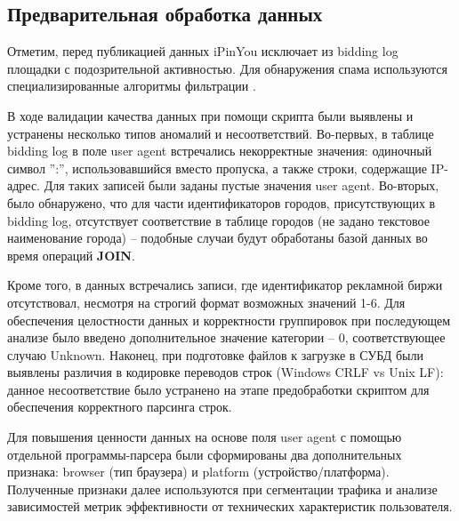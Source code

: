 \subsection{Предварительная обработка данных}
\label{subsec:data_preprocessing}

Отметим, перед публикацией данных iPinYou исключает из bidding log площадки с подозрительной активностью. Для обнаружения спама используются специализированные алгоритмы фильтрации \cite{ipinyou-contest-database}.

В ходе валидации качества данных при помощи скрипта были выявлены и устранены несколько типов аномалий и несоответствий. Во-первых, в таблице bidding log в поле user agent встречались некорректные значения: одиночный символ '':'', использовавшийся вместо пропуска, а также строки, содержащие IP-адрес. Для таких записей были заданы пустые значения user agent. Во-вторых, было обнаружено, что для части идентификаторов городов, присутствующих в bidding log, отсутствует соответствие в таблице городов (не задано текстовое наименование города) -- подобные случаи будут обработаны базой данных во время операций \textbf{JOIN}.

Кроме того, в данных встречались записи, где идентификатор рекламной биржи отсутствовал, несмотря на строгий формат возможных значений 1-6. Для обеспечения целостности данных и корректности группировок при последующем анализе было введено дополнительное значение категории -- 0, соответствующее случаю Unknown. Наконец, при подготовке файлов к загрузке в СУБД были выявлены различия в кодировке переводов строк (Windows CRLF vs Unix LF): данное несоответствие было устранено на этапе предобработки скриптом для обеспечения корректного парсинга строк.

Для повышения ценности данных на основе поля user agent с помощью отдельной программы-парсера были сформированы два дополнительных признака: browser (тип браузера) и platform (устройство/платформа). Полученные признаки далее используются при сегментации трафика и анализе зависимостей метрик эффективности от технических характеристик пользователя.

